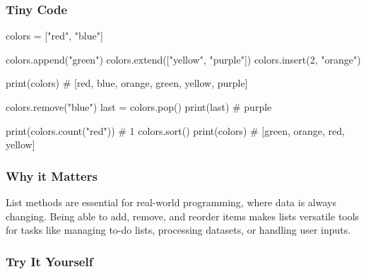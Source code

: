 \documentclass[
  letterpaper,
  DIV=11,
  numbers=noendperiod]{scrreprt}
\newenvironment{Shaded}{\begin{snugshade}}{\end{snugshade}}
\newcommand{\BuiltInTok}[1]{\textcolor[rgb]{0.00,0.23,0.31}{#1}}
\newcommand{\CommentTok}[1]{\textcolor[rgb]{0.37,0.37,0.37}{#1}}
\newcommand{\DecValTok}[1]{\textcolor[rgb]{0.68,0.00,0.00}{#1}}
\newcommand{\NormalTok}[1]{\textcolor[rgb]{0.00,0.23,0.31}{#1}}
\newcommand{\OperatorTok}[1]{\textcolor[rgb]{0.37,0.37,0.37}{#1}}
\newcommand{\StringTok}[1]{\textcolor[rgb]{0.13,0.47,0.30}{#1}}
\begin{document}
\subsubsection{Tiny Code}\label{tiny-code-23}

\begin{Shaded}
\begin{Highlighting}[]
\NormalTok{colors }\OperatorTok{=}\NormalTok{ [}\StringTok{"red"}\NormalTok{, }\StringTok{"blue"}\NormalTok{]}

\NormalTok{colors.append(}\StringTok{"green"}\NormalTok{)}
\NormalTok{colors.extend([}\StringTok{"yellow"}\NormalTok{, }\StringTok{"purple"}\NormalTok{])}
\NormalTok{colors.insert(}\DecValTok{2}\NormalTok{, }\StringTok{"orange"}\NormalTok{)}

\BuiltInTok{print}\NormalTok{(colors)  }\CommentTok{\# [\textquotesingle{}red\textquotesingle{}, \textquotesingle{}blue\textquotesingle{}, \textquotesingle{}orange\textquotesingle{}, \textquotesingle{}green\textquotesingle{}, \textquotesingle{}yellow\textquotesingle{}, \textquotesingle{}purple\textquotesingle{}]}

\NormalTok{colors.remove(}\StringTok{"blue"}\NormalTok{)}
\NormalTok{last }\OperatorTok{=}\NormalTok{ colors.pop()}
\BuiltInTok{print}\NormalTok{(last)    }\CommentTok{\# \textquotesingle{}purple\textquotesingle{}}

\BuiltInTok{print}\NormalTok{(colors.count(}\StringTok{"red"}\NormalTok{))   }\CommentTok{\# 1}
\NormalTok{colors.sort()}
\BuiltInTok{print}\NormalTok{(colors)  }\CommentTok{\# [\textquotesingle{}green\textquotesingle{}, \textquotesingle{}orange\textquotesingle{}, \textquotesingle{}red\textquotesingle{}, \textquotesingle{}yellow\textquotesingle{}]}
\end{Highlighting}
\end{Shaded}

\subsubsection{Why it Matters}\label{why-it-matters-23}

List methods are essential for real-world programming, where data is
always changing. Being able to add, remove, and reorder items makes
lists versatile tools for tasks like managing to-do lists, processing
datasets, or handling user inputs.

\subsubsection{Try It Yourself}\label{try-it-yourself-23}
\end{document}
